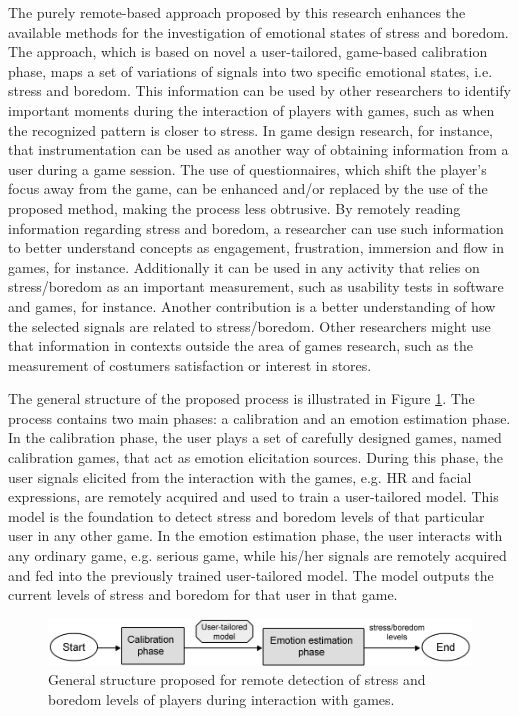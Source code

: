 The purely remote-based approach proposed by this research enhances the available methods for the investigation of emotional states of stress and boredom. The approach, which is based on novel a user-tailored, game-based calibration phase, maps a set of variations of signals into two specific emotional states, i.e. stress and boredom. This information can be used by other researchers to identify important moments during the interaction of players with games, such as when the recognized pattern is closer to stress. In game design research, for instance, that instrumentation can be used as another way of obtaining information from a user during a game session. The use of questionnaires, which shift the player's focus away from the game, can be enhanced and/or replaced by the use of the proposed method, making the process less obtrusive. By remotely reading information regarding stress and boredom, a researcher can use such information to better understand concepts as engagement, frustration, immersion and flow in games, for instance. Additionally it can be used in any activity that relies on stress/boredom as an important measurement, such as usability tests in software and games, for instance. Another contribution is a better understanding of how the selected signals are related to stress/boredom. Other researchers might use that information in contexts outside the area of games research, such as the measurement of costumers satisfaction or interest in stores.

The general structure of the proposed process is illustrated in Figure \ref{fig:research-aim-general}. The process contains two main phases: a calibration and an emotion estimation phase. In the calibration phase, the user plays a set of carefully designed games, named calibration games, that act as emotion elicitation sources. During this phase, the user signals elicited from the interaction with the games, e.g. HR and facial expressions, are remotely acquired and used to train a user-tailored model. This model is the foundation to detect stress and boredom levels of that particular user in any other game. In the emotion estimation phase, the user interacts with any ordinary game, e.g. serious game, while his/her signals are remotely acquired and fed into the previously trained user-tailored model. The model outputs the current levels of stress and boredom for that user in that game.

\begin{figure}[h!]
    \centering
    \includegraphics[width=\textwidth]{Content/figures/research-aim-general.png}
    \caption{General structure proposed for remote detection of stress and boredom levels of players during interaction with games.}
    \label{fig:research-aim-general}
\end{figure}

